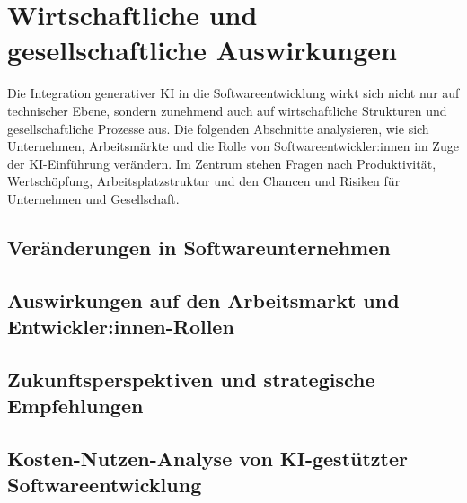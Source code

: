 \chapter{Wirtschaftliche und gesellschaftliche Auswirkungen}
\label{chap:wirtschaftliche_und_gesellschaftliche_auswirkungen}
Die Integration generativer KI in die Softwareentwicklung wirkt sich nicht nur auf technischer Ebene, sondern zunehmend auch auf wirtschaftliche Strukturen und gesellschaftliche Prozesse aus. Die folgenden Abschnitte analysieren, wie sich Unternehmen, Arbeitsmärkte und die Rolle von Softwareentwickler:innen im Zuge der KI-Einführung verändern. Im Zentrum stehen Fragen nach Produktivität, Wertschöpfung, Arbeitsplatzstruktur und den Chancen und Risiken für Unternehmen und Gesellschaft.

\section{Veränderungen in Softwareunternehmen}


\section{Auswirkungen auf den Arbeitsmarkt und Entwickler:innen-Rollen}


\section{Zukunftsperspektiven und strategische Empfehlungen}


\section{Kosten-Nutzen-Analyse von KI-gestützter Softwareentwicklung}
